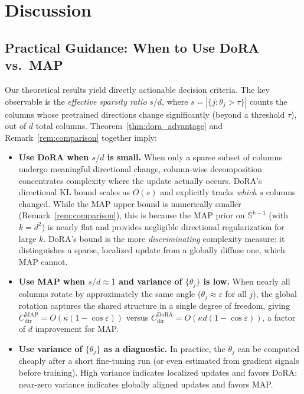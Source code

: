 \documentclass[11pt]{article}
\begin{document}

\section{Discussion}
\label{sec:discussion}

\subsection{Practical Guidance: When to Use DoRA vs.\ MAP}
\label{sec:disc_guidance}

Our theoretical results yield directly actionable decision criteria.
The key observable is the \emph{effective sparsity ratio} $s/d$, where
$s = |\{j : \theta_j > \tau\}|$ counts the columns whose pretrained
directions change significantly (beyond a threshold $\tau$), out of $d$
total columns.
Theorem~\ref{thm:dora_advantage} and Remark~\ref{rem:comparison} together imply:

\begin{itemize}
  \item \textbf{Use DoRA when $s/d$ is small.}  When only a sparse subset
    of columns undergo meaningful directional change, column-wise
    decomposition concentrates complexity where the update actually occurs.
    DoRA's directional KL bound scales as $O(s)$ and explicitly tracks
    \emph{which} $s$ columns changed.
    While the MAP upper bound is numerically smaller (Remark~\ref{rem:comparison}),
    this is because the MAP prior on $\mathbb{S}^{k-1}$ (with $k = d^2$) is
    nearly flat and provides negligible directional regularization for large $k$.
    DoRA's bound is the more \emph{discriminating} complexity measure:
    it distinguishes a sparse, localized update from a globally diffuse one,
    which MAP cannot.

  \item \textbf{Use MAP when $s/d \approx 1$ and variance of
    $\{\theta_j\}$ is low.}  When nearly all columns rotate by
    approximately the same angle ($\theta_j \approx \varepsilon$ for
    all $j$), the global rotation captures the shared structure in a single
    degree of freedom, giving
    $C^{\mathrm{MAP}}_{\mathrm{dir}} = O(\kappa(1 - \cos\varepsilon))$
    versus
    $C^{\mathrm{DoRA}}_{\mathrm{dir}} = O(\kappa d (1 - \cos\varepsilon))$,
    a factor of $d$ improvement for MAP.

  \item \textbf{Use variance of $\{\theta_j\}$ as a diagnostic.}
    In practice, the $\theta_j$ can be computed cheaply after a short
    fine-tuning run (or even estimated from gradient signals before
    training).  High variance indicates localized updates and favors
    DoRA; near-zero variance indicates globally aligned updates and
    favors MAP.
\end{itemize}
\end{document}
